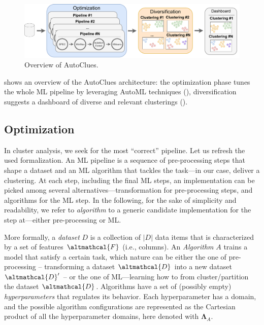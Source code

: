 \begin{figure}[t]
    \centering
    \includegraphics[scale=.33]{chapters/data-centric/unsupervised/img/approach.pdf}
    \caption{Overview of AutoClues.}
    \label{clustering-fig:overview}
\end{figure}

 shows an overview of the AutoClues architecture:  the optimization phase tunes the whole ML pipeline by leveraging AutoML techniques (), diversification suggests a dashboard of diverse and relevant clusterings ().

\subsection{Optimization}
\label{clustering-ssec:automl}

In cluster analysis, we seek for the most ``correct'' pipeline.
Let us refresh the used formalization.
An ML pipeline is a sequence of pre-processing steps that shape a dataset and an ML algorithm that tackles the task---in our case, deliver a clustering.
At each step, including the final ML steps, an implementation can be picked among several alternatives---transformation for pre-processing steps, and algorithms for the ML step.
In the following, for the sake of simplicity and readability, we refer to \textit{algorithm} to a generic candidate implementation for the step at---either pre-processing or ML.

More formally, a \textit{dataset} $D$ is a collection of $|D|$ data items that is characterized by a set of features $\altmathcal{F}$ (i.e., columns).
An \textit{Algorithm} $A$ trains a model that satisfy a certain task, which nature can be either the one of pre-processing -- transforming a dataset $\altmathcal{D}$ into a new dataset $\altmathcal{D}'$ -- or the one of ML---learning how to from cluster/partition the dataset $\altmathcal{D}$.
Algorithms have a set of (possibly empty) \textit{hyperparameters} that regulates its behavior.
Each hyperparameter has a domain, and the possible algorithm configurations are represented as the Cartesian product of all the hyperparameter domains, here denoted with $\pmb{\Lambda}_A$.

